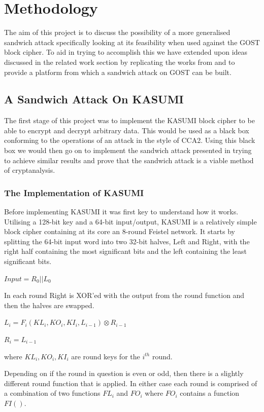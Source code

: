 \documentclass[10pt,journal,compsoc]{IEEEtran}
\begin{document}
\section{Methodology}
The aim of this project is to discuss the possibility of a more generalised sandwich attack specifically looking at its feasibility when used against the GOST block cipher. To aid in trying to accomplish this we have extended upon ideas discussed in the related work section by replicating the works from \cite{C:DunKelSha10} and \cite{cryptoeprint:2010/111} to provide a platform from which a sandwich attack on GOST can be built.

\subsection{A Sandwich Attack On KASUMI}
The first stage of this project was to implement the KASUMI block cipher to be able to encrypt and decrypt arbitrary data. This would be used as a black box conforming to the operations of an attack in the style of CCA2. Using this black box we would then go on to implement the sandwich attack presented in \cite{C:DunKelSha10} trying to achieve similar results and prove that the sandwich attack is a viable method of cryptanalysis.

\subsubsection{The Implementation of KASUMI}
Before implementing KASUMI it was first key to understand how it works. Utilising a 128-bit key and a 64-bit input/output, KASUMI is a relatively simple block cipher containing at its core an 8-round Feistel network. It starts by splitting the 64-bit input word into two 32-bit halves, Left and Right, with the right half containing the most significant bits and the left containing the least significant bits.

\begin{center}
    \(Input = R_0 || L_0\)
\end{center}
In each round Right is XOR'ed with the output from the round function and then the halves are swapped.
\begin{center}
    \(L_i = F_i(KL_i, KO_i, KI_i, L_{i-1}) \otimes R_{i-1}\)
    
    \(R_i = L_{i-1}\)
\end{center}
where \(KL_i, KO_i, KI_i\) are round keys for the \(i^{th}\) round.

Depending on if the round in question is even or odd, then there is a slightly different round function that is applied. In either case each round is comprised of a combination of two functions \(FL_i\) and \(FO_i\) where \(FO_i\) contains a function \(FI()\).
\end{document}
